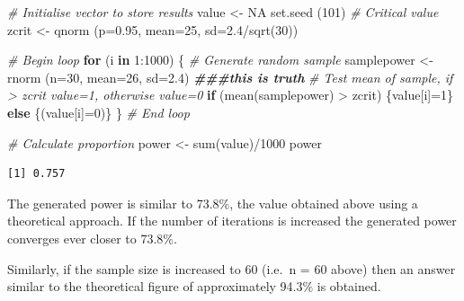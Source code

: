 \documentclass[
  oneside]{krantz}
\newenvironment{Shaded}{\begin{snugshade}}{\end{snugshade}}
\newcommand{\AttributeTok}[1]{\textcolor[rgb]{0.77,0.63,0.00}{#1}}
\newcommand{\CommentTok}[1]{\textcolor[rgb]{0.56,0.35,0.01}{\textit{#1}}}
\newcommand{\ConstantTok}[1]{\textcolor[rgb]{0.00,0.00,0.00}{#1}}
\newcommand{\ControlFlowTok}[1]{\textcolor[rgb]{0.13,0.29,0.53}{\textbf{#1}}}
\newcommand{\DecValTok}[1]{\textcolor[rgb]{0.00,0.00,0.81}{#1}}
\newcommand{\DocumentationTok}[1]{\textcolor[rgb]{0.56,0.35,0.01}{\textbf{\textit{#1}}}}
\newcommand{\FloatTok}[1]{\textcolor[rgb]{0.00,0.00,0.81}{#1}}
\newcommand{\FunctionTok}[1]{\textcolor[rgb]{0.00,0.00,0.00}{#1}}
\newcommand{\NormalTok}[1]{#1}
\newcommand{\OtherTok}[1]{\textcolor[rgb]{0.56,0.35,0.01}{#1}}
\newcommand{\SpecialCharTok}[1]{\textcolor[rgb]{0.00,0.00,0.00}{#1}}
\begin{document}
\begin{Shaded}
\begin{Highlighting}[]
\CommentTok{\# Initialise vector to store results}
\NormalTok{value }\OtherTok{\textless{}{-}} \ConstantTok{NA}
\FunctionTok{set.seed}\NormalTok{ (}\DecValTok{101}\NormalTok{)}
\CommentTok{\# Critical value}
\NormalTok{zcrit }\OtherTok{\textless{}{-}} \FunctionTok{qnorm}\NormalTok{ (}\AttributeTok{p=}\FloatTok{0.95}\NormalTok{, }\AttributeTok{mean=}\DecValTok{25}\NormalTok{, }\AttributeTok{sd=}\FloatTok{2.4}\SpecialCharTok{/}\FunctionTok{sqrt}\NormalTok{(}\DecValTok{30}\NormalTok{))}

\CommentTok{\# Begin loop}
\ControlFlowTok{for}\NormalTok{ (i }\ControlFlowTok{in} \DecValTok{1}\SpecialCharTok{:}\DecValTok{1000}\NormalTok{) \{}
  \CommentTok{\# Generate random sample}
\NormalTok{  samplepower }\OtherTok{\textless{}{-}} \FunctionTok{rnorm}\NormalTok{ (}\AttributeTok{n=}\DecValTok{30}\NormalTok{, }\AttributeTok{mean=}\DecValTok{26}\NormalTok{, }\AttributeTok{sd=}\FloatTok{2.4}\NormalTok{) }\DocumentationTok{\#\#\#this is truth}
  \CommentTok{\# Test mean of sample, if \textgreater{} zcrit value=1, otherwise value=0}
  \ControlFlowTok{if}\NormalTok{ (}\FunctionTok{mean}\NormalTok{(samplepower) }\SpecialCharTok{\textgreater{}}\NormalTok{ zcrit) \{value[i]}\OtherTok{=}\DecValTok{1}\NormalTok{\}}
  \ControlFlowTok{else}\NormalTok{ \{(value[i]}\OtherTok{=}\DecValTok{0}\NormalTok{)\}}
\NormalTok{\} }\CommentTok{\# End loop}

\CommentTok{\# Calculate proportion}
\NormalTok{power }\OtherTok{\textless{}{-}} \FunctionTok{sum}\NormalTok{(value)}\SpecialCharTok{/}\DecValTok{1000}
\NormalTok{power}
\end{Highlighting}
\end{Shaded}

\begin{verbatim}
[1] 0.757
\end{verbatim}

The generated power is similar to 73.8\%, the value obtained above using a theoretical approach. If the number of iterations is increased the generated power converges ever closer to 73.8\%.

Similarly, if the sample size is increased to 60 (i.e.~n = 60 above) then an answer similar to the theoretical figure of approximately 94.3\% is obtained.
\end{document}
